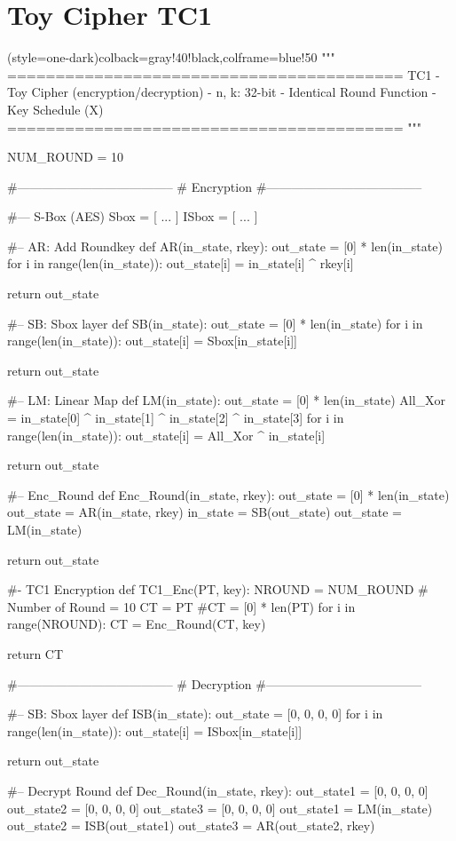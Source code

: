 \section*{Toy Cipher TC1}
\begin{python}[TC1Lib.py](style=one-dark){colback=gray!40!black,colframe=blue!50}
"""
=========================================
TC1 - Toy Cipher (encryption/decryption)
- n, k: 32-bit
- Identical Round Function
- Key Schedule (X)
=========================================
"""

NUM_ROUND = 10

#--------------------------------------
#  Encryption
#--------------------------------------

#--- S-Box (AES)
Sbox = [ ... ]
ISbox = [ ... ]

#-- AR: Add Roundkey
def AR(in_state, rkey):
   out_state = [0] * len(in_state)
   for i in range(len(in_state)):
      out_state[i] = in_state[i] ^ rkey[i] 
   
   return out_state

#-- SB: Sbox layer
def SB(in_state):
   out_state = [0] * len(in_state)
   for i in range(len(in_state)):
      out_state[i] = Sbox[in_state[i]]
   
   return out_state

#-- LM: Linear Map
def LM(in_state):
   out_state = [0] * len(in_state)
   All_Xor = in_state[0] ^ in_state[1] ^ in_state[2] ^ in_state[3]
   for i in range(len(in_state)):
      out_state[i] = All_Xor ^ in_state[i]
   
   return out_state

#-- Enc_Round
def Enc_Round(in_state, rkey):
   out_state = [0] * len(in_state)
   out_state = AR(in_state, rkey)
   in_state = SB(out_state)
   out_state = LM(in_state)
   
   return out_state

#- TC1 Encryption
def TC1_Enc(PT, key):
   NROUND = NUM_ROUND # Number of Round = 10
   CT = PT #CT = [0] * len(PT)
   for i in range(NROUND):
      CT = Enc_Round(CT, key)
   
   return CT

#--------------------------------------
#  Decryption
#--------------------------------------

#-- SB: Sbox layer
def ISB(in_state):
   out_state = [0, 0, 0, 0]
   for i in range(len(in_state)):
      out_state[i] = ISbox[in_state[i]]
   
   return out_state

#-- Decrypt Round
def Dec_Round(in_state, rkey):
   out_state1 = [0, 0, 0, 0]
   out_state2 = [0, 0, 0, 0]
   out_state3 = [0, 0, 0, 0]
   out_state1 = LM(in_state)
   out_state2 = ISB(out_state1)
   out_state3 = AR(out_state2, rkey)
   

\end{python}
